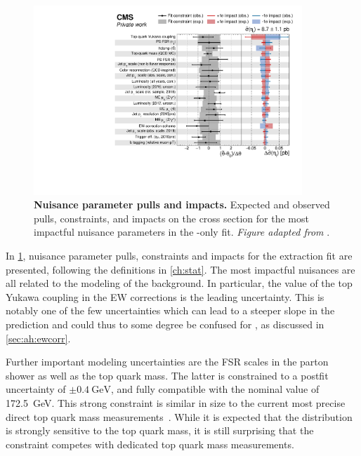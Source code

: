 \begin{figure}[th]
    \centering
    \includegraphics[width=0.9\textwidth]{figures/ah/etatfit/impacts_nonps.pdf}
    \caption{
        \textbf{Nuisance parameter pulls and impacts.} Expected and observed pulls, constraints, and impacts on the \etat cross section for the most impactful nuisance parameters in the \etat-only fit. \textit{Figure adapted from }.
    }
    \label{fig:ah:impacts_etat}
\end{figure}

In \cref{fig:ah:impacts_etat}, nuisance parameter pulls, constraints and impacts for the \etat extraction fit are presented, following the definitions in \cref{ch:stat}. The most impactful nuisances are all related to the modeling of the \ttbar background. In particular, %
the value of the top Yukawa coupling \yt in the EW corrections is the leading uncertainty. This is notably one of the few uncertainties which can lead to a steeper \chel slope in the \ttbar prediction and could thus to some degree be confused for \etat, as discussed in \cref{sec:ah:ewcorr}.

Further important modeling uncertainties are the FSR scales in the \ttbar parton shower as well as the top quark mass. 
The latter is constrained to a postfit uncertainty of $\pm \SI{0.4}{\GeV}$, and fully compatible with the nominal value of \SI{172.5}{\GeV}. This strong constraint is similar in size to the current most precise direct top quark mass measurements~\cite{CMS:TOP-20-008,ATLASCMS:2024dxp}. While it is expected that the \mtt distribution is strongly sensitive to the top quark mass, it is still surprising that the constraint competes with dedicated top quark mass measurements.

